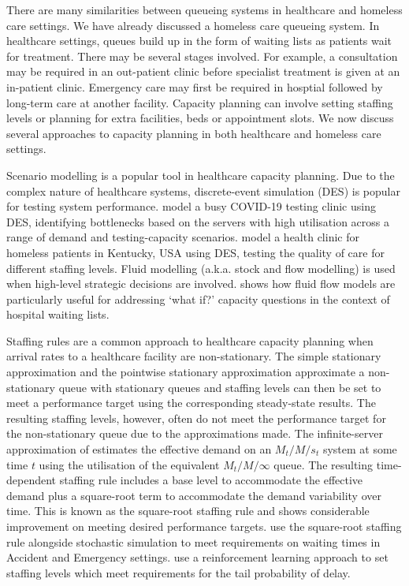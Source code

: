 \documentclass[12pt,a4paper]{article}
\begin{document}
There are many similarities between queueing systems in healthcare and homeless care settings. We have already discussed a homeless care queueing system. In healthcare settings, queues build up in the form of waiting lists as patients wait for treatment. There may be several stages involved. For example, a consultation may be required in an out-patient clinic before specialist treatment is given at an in-patient clinic. Emergency care may first be required in hosptial followed by long-term care at another facility. Capacity planning can involve setting staffing levels or planning for extra facilities, beds or appointment slots. We now discuss several approaches to capacity planning in both healthcare and homeless care settings. 

Scenario modelling is a popular tool in healthcare capacity planning. Due to the complex nature of healthcare systems, discrete-event simulation (DES) is popular for testing system performance. \cite{el2021supporting} model a busy COVID-19 testing clinic using DES, identifying bottlenecks based on the servers with high utilisation across a range of demand and testing-capacity scenarios. \cite{reynolds2010design} model a health clinic for homeless patients in Kentucky, USA using DES, testing the quality of care for different staffing levels. Fluid modelling (a.k.a. stock and flow modelling) is used when high-level strategic decisions are involved. \cite{worthington1991hospital} shows how fluid flow models are particularly useful for addressing `what if?' capacity questions in the context of hospital waiting lists.

Staffing rules are a common approach to healthcare capacity planning when arrival rates to a healthcare facility are non-stationary. The simple stationary approximation \citep{green1991some} and the pointwise stationary approximation \citep{green1991pointwise} approximate a non-stationary queue with stationary queues and staffing levels can then be set to meet a performance target using the corresponding steady-state results. The resulting staffing levels, however, often do not meet the performance target for the non-stationary queue due to the approximations made. The infinite-server approximation of \cite{jennings1996server} estimates the effective demand on an $M_t/M/s_t$ system at some time $t$ using the utilisation of the equivalent $M_t/M/\infty$ queue. The resulting time-dependent staffing rule includes a base level to accommodate the effective demand plus a square-root term to accommodate the demand variability over time. This is known as the square-root staffing rule and shows considerable improvement on meeting desired performance targets. \cite{izady2012setting} use the square-root staffing rule alongside stochastic simulation to meet requirements on waiting times in Accident and Emergency settings. \cite{konrad2023achieving} use a reinforcement learning approach to set staffing levels which meet requirements for the tail probability of delay. 
\end{document}
